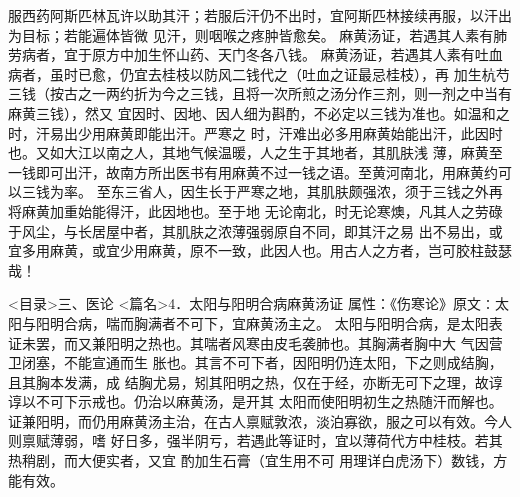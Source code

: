 \documentclass[a4paper,12pt,UTF8,twoside]{ctexbook}
\begin{document}
服西药阿斯匹林瓦许以助其汗；若服后汗仍不出时，宜阿斯匹林接续再服，以汗出为目标；若能遍体皆微 
见汗，则咽喉之疼肿皆愈矣。 
麻黄汤证，若遇其人素有肺劳病者，宜于原方中加生怀山药、天门冬各八钱。 
麻黄汤证，若遇其人素有吐血病者，虽时已愈，仍宜去桂枝以防风二钱代之（吐血之证最忌桂枝），再 
加生杭芍三钱（按古之一两约折为今之三钱，且将一次所煎之汤分作三剂，则一剂之中当有麻黄三钱），然又 
宜因时、因地、因人细为斟酌，不必定以三钱为准也。如温和之时，汗易出少用麻黄即能出汗。严寒之 
时，汗难出必多用麻黄始能出汗，此因时也。又如大江以南之人，其地气候温暖，人之生于其地者，其肌肤浅 
薄，麻黄至一钱即可出汗，故南方所出医书有用麻黄不过一钱之语。至黄河南北，用麻黄约可以三钱为率。 
至东三省人，因生长于严寒之地，其肌肤颇强浓，须于三钱之外再将麻黄加重始能得汗，此因地也。至于地 
无论南北，时无论寒燠，凡其人之劳碌于风尘，与长居屋中者，其肌肤之浓薄强弱原自不同，即其汗之易 
出不易出，或宜多用麻黄，或宜少用麻黄，原不一致，此因人也。用古人之方者，岂可胶柱鼓瑟哉！ 

<目录>三、医论
<篇名>4．太阳与阳明合病麻黄汤证
属性：《伤寒论》原文∶太阳与阳明合病，喘而胸满者不可下，宜麻黄汤主之。 
太阳与阳明合病，是太阳表证未罢，而又兼阳明之热也。其喘者风寒由皮毛袭肺也。其胸满者胸中大 
气因营卫闭塞，不能宣通而生 胀也。其言不可下者，因阳明仍连太阳，下之则成结胸，且其胸本发满，成 
结胸尤易，矧其阳明之热，仅在于经，亦断无可下之理，故谆谆以不可下示戒也。仍治以麻黄汤，是开其 
太阳而使阳明初生之热随汗而解也。 
证兼阳明，而仍用麻黄汤主治，在古人禀赋敦浓，淡泊寡欲，服之可以有效。今人则禀赋薄弱，嗜 
好日多，强半阴亏，若遇此等证时，宜以薄荷代方中桂枝。若其热稍剧，而大便实者，又宜 
酌加生石膏（宜生用不可 用理详白虎汤下）数钱，方能有效。 
\end{document}
